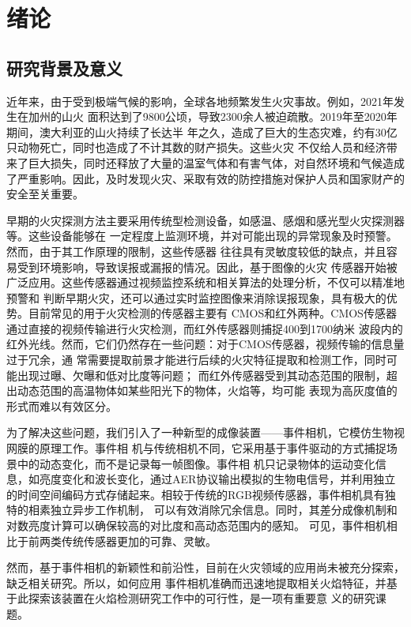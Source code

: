 
\chapter{绪论}

\section{研究背景及意义}

近年来，由于受到极端气候的影响，全球各地频繁发生火灾事故。例如，2021年发生在加州的山火
面积达到了9800公顷，导致2300余人被迫疏散。2019年至2020年期间，澳大利亚的山火持续了长达半
年之久，造成了巨大的生态灾难，约有30亿只动物死亡，同时也造成了不计其数的财产损失。这些火灾
不仅给人员和经济带来了巨大损失，同时还释放了大量的温室气体和有害气体，对自然环境和气候造成
了严重影响。因此，及时发现火灾、采取有效的防控措施对保护人员和国家财产的安全至关重要。

早期的火灾探测方法主要采用传统型检测设备，如感温、感烟和感光型火灾探测器等。这些设备能够在
一定程度上监测环境，并对可能出现的异常现象及时预警。然而，由于其工作原理的限制，这些传感器
往往具有灵敏度较低的缺点，并且容易受到环境影响，导致误报或漏报的情况。因此，基于图像的火灾
传感器开始被广泛应用。这些传感器通过视频监控系统和相关算法的处理分析，不仅可以精准地预警和
判断早期火灾，还可以通过实时监控图像来消除误报现象，具有极大的优势。目前常见的用于火灾检测的传感器主要有
CMOS和红外两种。CMOS传感器通过直接的视频传输进行火灾检测，而红外传感器则捕捉400到1700纳米
波段内的红外光线。然而，它们仍然存在一些问题：对于CMOS传感器，视频传输的信息量过于冗余，通
常需要提取前景才能进行后续的火灾特征提取和检测工作，同时可能出现过曝、欠曝和低对比度等问题；
而红外传感器受到其动态范围的限制，超出动态范围的高温物体如某些阳光下的物体，火焰等，均可能
表现为高灰度值的形式而难以有效区分。

为了解决这些问题，我们引入了一种新型的成像装置——事件相机，它模仿生物视网膜的原理工作。事件相
机与传统相机不同，它采用基于事件驱动的方式捕捉场景中的动态变化，而不是记录每一帧图像。事件相
机只记录物体的运动变化信息，如亮度变化和波长变化，通过AER协议输出模拟的生物电信号，并利用独立
的时间空间编码方式存储起来。相较于传统的RGB视频传感器，事件相机具有独特的相素独立异步工作机制，
可以有效消除冗余信息。同时，其差分成像机制和对数亮度计算可以确保较高的对比度和高动态范围内的感知。
可见，事件相机相比于前两类传统传感器更加的可靠、灵敏。

然而，基于事件相机的新颖性和前沿性，目前在火灾领域的应用尚未被充分探索，缺乏相关研究。所以，如何应用
事件相机准确而迅速地提取相关火焰特征，并基于此探索该装置在火焰检测研究工作中的可行性，是一项有重要意
义的研究课题。


